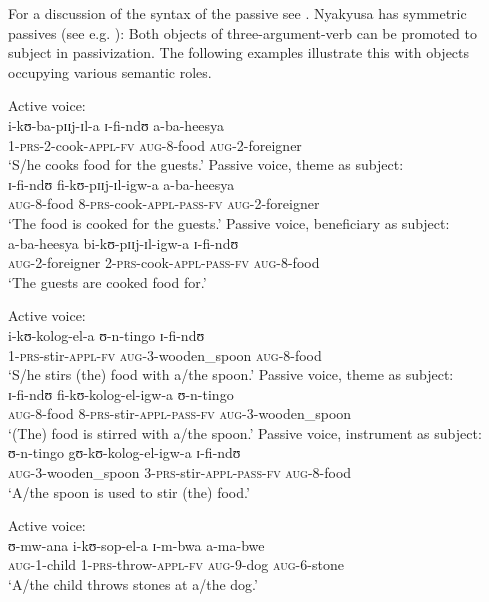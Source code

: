 For a discussion of the syntax of the passive see \citet{LusekeloA2012}. Nyakyusa has symmetric passives (see e.g. \citealt{BresnanJMoshiL1990}): Both objects of three-argument-verb can be promoted to subject in passivization. The following examples illustrate this with objects occupying various semantic roles.
\begin{exe}
\ex
\begin{xlist}
\ex Active voice:\\
\gll i-kʊ-ba-pɪɪj-ɪl-a ɪ-fi-ndʊ a-ba-heesya\\
1-\textsc{prs}-2-cook-\textsc{appl}-\textsc{fv} \textsc{aug}-8-food \textsc{aug}-2-foreigner\\
\glt \lq S/he cooks food for the guests.'
\ex Passive voice, theme as subject:\\
\gll ɪ-fi-ndʊ fi-kʊ-pɪɪj-ɪl-igw-a a-ba-heesya\\
\textsc{aug}-8-food 8-\textsc{prs}-cook-\textsc{appl}-\textsc{pass}-\textsc{fv} \textsc{aug}-2-foreigner\\
\glt \lq The food is cooked for the guests.'
\ex Passive voice, beneficiary as subject:\\
\gll a-ba-heesya bi-kʊ-pɪɪj-ɪl-igw-a ɪ-fi-ndʊ\\
\textsc{aug}-2-foreigner 2-\textsc{prs}-cook-\textsc{appl}-\textsc{pass}-\textsc{fv} \textsc{aug}-8-food\\
\glt \lq The guests are cooked food for.'\footnotemark
\end{xlist}
\ex
\begin{xlist}
\ex Active voice:\\
\gll i-kʊ-kolog-el-a ʊ-n-tingo ɪ-fi-ndʊ\\
1-\textsc{prs}-stir-\textsc{appl}-\textsc{fv} \textsc{aug}-3-wooden\_spoon \textsc{aug}-8-food\\
\glt \lq S/he stirs (the) food with a/the spoon.'
\ex Passive voice, theme as subject:\\
\gll ɪ-fi-ndʊ fi-kʊ-kolog-el-igw-a ʊ-n-tingo\\
\textsc{aug}-8-food 8-\textsc{prs}-stir-\textsc{appl}-\textsc{pass}-\textsc{fv} \textsc{aug}-3-wooden\_spoon\\
\glt \lq (The) food is stirred with a/the spoon.'
\ex Passive voice, instrument as subject:\\
\gll ʊ-n-tingo gʊ-kʊ-kolog-el-igw-a ɪ-fi-ndʊ\\
\textsc{aug}-3-wooden\_spoon 3-\textsc{prs}-stir-\textsc{appl}-\textsc{pass}-\textsc{fv} \textsc{aug}-8-food\\
\glt \lq A/the spoon is used to stir (the) food.'
\end{xlist}
\ex
\begin{xlist}
\ex Active voice:\\
\gll ʊ-mw-ana i-kʊ-sop-el-a ɪ-m-bwa a-ma-bwe\\
\textsc{aug}-1-child 1-\textsc{prs}-throw-\textsc{appl}-\textsc{fv} \textsc{aug}-9-dog \textsc{aug}-6-stone\\
\glt \lq A/the child throws stones at a/the dog.'


\end{xlist}
\end{exe}
